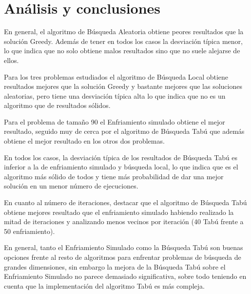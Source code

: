 \documentclass[runningheads,a4paper]{llncs}
\begin{document}
\section{Análisis y conclusiones}

En general, el algoritmo de Búsqueda Aleatoria obtiene peores resultados que la solución Greedy. Además de tener en todos los casos la desviación típica menor, lo que indica que no solo obtiene malos resultados sino que no suele alejarse de ellos.

Para los tres problemas estudiados el algoritmo de Búsqueda Local obtiene resultados mejores que la solución Greedy y bastante mejores que las soluciones aleatorias, pero tiene una desviación típica alta lo que indica que no es un algoritmo que de resultados sólidos.

Para el problema de tamaño 90 el Enfriamiento simulado obtiene el mejor resultado, seguido muy de cerca por el algoritmo de Búsqueda Tabú que además obtiene el mejor resultado en los otros dos problemas. 

En todos los casos, la desviación típica de los resultados de Búsqueda Tabú es inferior a la de enfriamiento simulado y búsqueda local, lo que indica que es el algoritmo más sólido de todos y tiene más probabilidad de dar una mejor solución en un menor número de ejecuciones.

En cuanto al número de iteraciones, destacar que el algoritmo de Búsqueda Tabú obtiene mejores resultado que el enfriamiento simulado habiendo realizado la mitad de iteraciones y analizando menos vecinos por iteración (40 Tabú frente a 50 enfriamiento).

En general, tanto el Enfriamiento Simulado como la Búsqueda Tabú son buenas opciones frente al resto de algoritmos para enfrentar problemas de búsqueda de grandes dimensiones, sin embargo la mejora de la Búsqueda Tabú sobre el Enfriamiento Simulado no parece demasiado significativa, sobre todo teniendo en cuenta que la implementación del algoritmo Tabú es más compleja.
\end{document}
